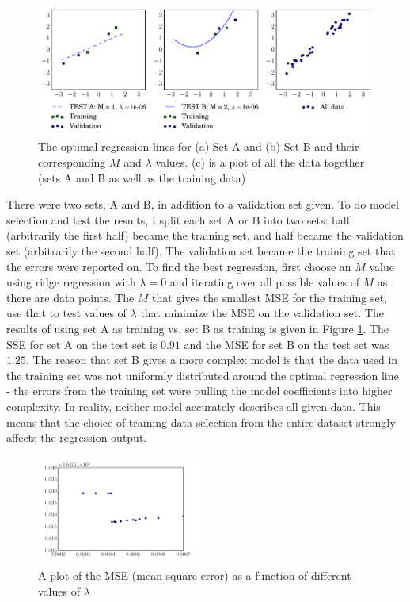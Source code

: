 \documentclass[10pt]{article}
\begin{document}
\begin{figure}[!ht]
	\centering
	\includegraphics[width=\textwidth]{exercise3-2-1.pdf}
	\caption{The optimal regression lines for (a) Set A and (b) Set B and their corresponding $M$ and $\lambda$ values. (c) is a plot of all the data together (sets A and B as well as the training data)}
	\label{fig:3-2}
\end{figure}

There were two sets, A and B, in addition to a validation set given. To do model selection and test the results, I split each set A or B into two sets: half (arbitrarily the first half) became the training set, and half became the validation set (arbitrarily the second half). The validation set became the training set that the errors were reported on. To find the best regression, first choose an $M$ value using ridge regression with $\lambda = 0$ and iterating over all possible values of $M$ as there are data points. The $M$ that gives the smallest MSE for the training set, use that to test values of $\lambda$ that minimize the MSE on the validation set. The results of using set A as training vs. set B as training is given in Figure \ref{fig:3-2}. The SSE for set A on the test set is $0.91$ and the MSE for set B on the test set was $1.25$. The reason that set B gives a more complex model is that the data used in the training set was not uniformly distributed around the optimal regression line - the errors from the training set were pulling the model coefficients into higher complexity. In reality, neither model accurately describes all given data. This means that the choice of training data selection from the entire dataset strongly affects the regression output.

\begin{figure}[!ht]
	\begin{center}
	\includegraphics[width=0.48\textwidth]{exercise3-2-3.pdf}
	\caption{A plot of the MSE (mean square error) as a function of different values of $\lambda$}
	\label{fig:3-3}
	\end{center}
\end{figure}
\end{document}
